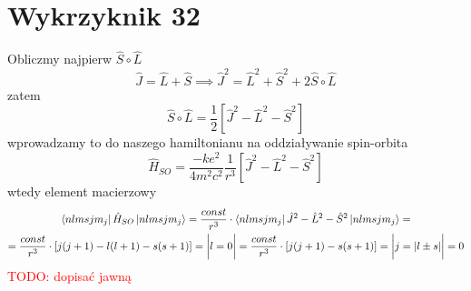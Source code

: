\documentclass[a4paper,12pt]{article}
\newcommand\myworries[1]{\textcolor{red}{#1}} %
\begin{document}
\section{Wykrzyknik 32}
 	Obliczmy najpierw $\hat{S}\circ\hat{L}$ 
 		$$
 		\hat{J}= \hat{L}+\hat{S} \implies \hat{J}^2 = \hat{L}^2+\hat{S}^2 + 2\hat{S}\circ\hat{L}
 		$$
 	zatem
 		$$
 		\hat{S}\circ\hat{L}=\frac{1}{2}\left[\hat{J}^2-\hat{L}^2-\hat{S}^2 \right]
 		$$
 	wprowadzamy to do naszego hamiltonianu na oddziaływanie spin-orbita 
 		$$
 		\hat{H}_{SO} = \frac{-ke^2}{4m^2c^2}\frac{1}{r^3}\left[\hat{J}^2-\hat{L}^2-\hat{S}^2 \right]
 		$$
 	wtedy element macierzowy
 		$$
 		\begin{gathered}
 			\bra{nlmsjm_j}\hat{H}_{SO}\ket{nlmsjm_j} = \frac{const}{r^3}\cdot\bra{nlmsjm_j}\hat{J}^2-\hat{L}^2-\hat{S}^2\ket{nlmsjm_j} = \\ =\frac{const}{r^3}\cdot\left[j(j+1) - l(l+1)-s(s+1)\right] = \bigg\vert l = 0\bigg\vert = \frac{const}{r^3}\cdot\left[j(j+1) -s(s+1)\right] = \bigg\vert j = |l\pm s| \bigg\vert = 0
 		\end{gathered}
 		$$
\myworries{TODO: dopisać jawną}
\end{document}
